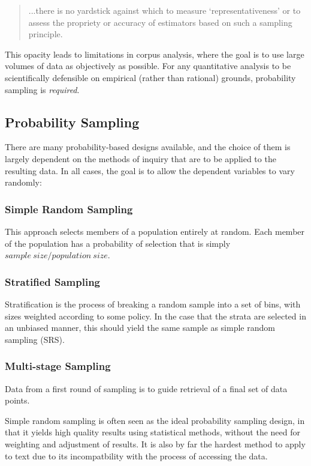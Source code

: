 \begin{quote}
...there is no yardstick against which to measure `representativeness' or to assess the propriety or accuracy of estimators based on such a sampling principle.
\end{quote}

This opacity leads to limitations in corpus analysis, where the goal is to use large volumes of data as objectively as possible.  For any quantitative analysis to be scientifically defensible on empirical (rather than rational) grounds, probability sampling is \textsl{required}.





\subsection{Probability Sampling}

There are many probability-based designs available, and the choice of them is largely dependent on the methods of inquiry that are to be applied to the resulting data.  In all cases, the goal is to allow the dependent variables to vary randomly:


\subsubsection{Simple Random Sampling}
This approach selects members of a population entirely at random.  Each member of the population has a probability of selection that is simply $sample~size/population~size$.
\subsubsection{Stratified Sampling}
Stratification is the process of breaking a random sample into a set of bins, with sizes weighted according to some policy.  In the case that the strata are selected in an unbiased manner, this should yield the same sample as simple random sampling (SRS).
\subsubsection{Multi-stage Sampling}
Data from a first round of sampling is to guide retrieval of a final set of data points.





Simple random sampling is often seen as the ideal probability sampling design, in that it yields high quality results using statistical methods, without the need for weighting and adjustment of results.  It is also by far the hardest method to apply to text due to its incompatbility with the process of accessing the data.

